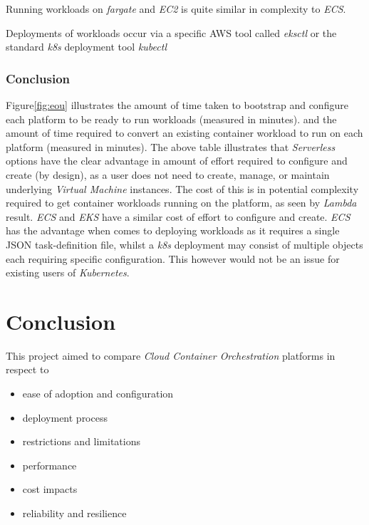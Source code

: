 Running workloads on \textit{fargate} and \textit{EC2} is quite similar in complexity to \textit{ECS}.

Deployments of workloads occur via a specific AWS tool called \emph{eksctl}\cite{weaveworks} or the standard \textit{k8s} deployment tool \emph{kubectl}\cite{kubectl}

\subsection*{Conclusion}
Figure\ref{fig:eou} illustrates the amount of time taken to bootstrap and configure each platform to be ready to run workloads (measured in minutes).
and the amount of time required to convert an existing container workload to run on each platform (measured in minutes).
The above table illustrates that \textit{Serverless} options have the clear advantage in amount of effort required to configure and create (by design), as a user does not need to
create, manage, or maintain underlying \textit{Virtual Machine} instances. The cost of this is in potential complexity required to get container workloads running on the
platform, as seen by \textit{Lambda} result.
\textit{ECS} and \textit{EKS} have a similar cost of effort to configure and create. \textit{ECS} has the advantage when comes to deploying workloads as it requires a
single JSON task-definition file, whilst a \textit{k8s} deployment may consist of multiple objects each requiring specific configuration.
This however would not be an issue for existing users of \textit{Kubernetes}.

\chapter{Conclusion}

This project aimed to compare \emph{Cloud Container Orchestration} platforms in respect to
\begin{itemize}
      \item ease of adoption and configuration
      \item deployment process
      \item restrictions and limitations
      \item performance
      \item cost impacts
      \item reliability and resilience
\end{itemize}

